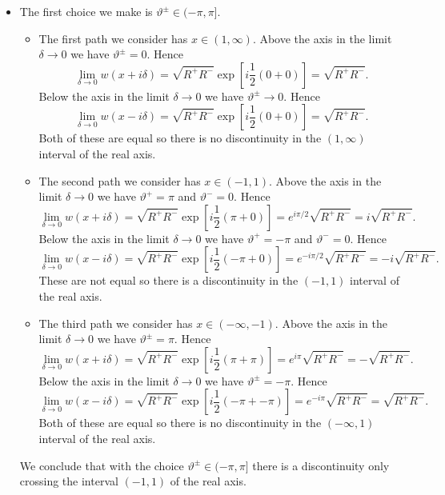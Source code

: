 \documentclass{article}
\begin{document}
    \begin{itemize}
        \item The first choice we make is \(\vartheta^\pm \in (-\pi, \pi]\).
        \begin{itemize}
            \item The first path we consider has \(x \in (1, \infty)\).
            \subitem Above the axis in the limit \(\delta \to 0\) we have \(\vartheta^{\pm} = 0\).
            Hence
            \[\lim_{\delta\to 0} w(x + i\delta) = \sqrt{R^+R^-}\exp\left[i\frac{1}{2}(0 + 0)\right] = \sqrt{R^+R^-}.\]
            \subitem Below the axis in the limit \(\delta \to 0\) we have \(\vartheta^{\pm} \to 0\).
            Hence
            \[\lim_{\delta\to 0} w(x - i\delta) = \sqrt{R^+R^-}\exp\left[i\frac{1}{2}(0 + 0)\right] = \sqrt{R^+R^-}.\]
            Both of these are equal so there is no discontinuity in the \((1, \infty)\) interval of the real axis.
            
            \item The second path we consider has \(x \in (-1, 1)\).
            \subitem Above the axis in the limit \(\delta \to 0\) we have \(\vartheta^+ = \pi\) and \(\vartheta^- = 0\).
            Hence
            \[\lim_{\delta\to 0} w(x + i\delta) = \sqrt{R^+R^-}\exp\left[i\frac{1}{2}(\pi + 0)\right] = e^{i\pi/2}\sqrt{R^+R^-} = i\sqrt{R^+R^-}.\]
            \subitem Below the axis in the limit \(\delta \to 0\) we have \(\vartheta^+ = -\pi\) and \(\vartheta^- = 0\).
            Hence
            \[\lim_{\delta\to 0} w(x - i\delta) = \sqrt{R^+R^-}\exp\left[i\frac{1}{2}(-\pi + 0)\right] = e^{-i\pi/2}\sqrt{R^+R^-} = -i\sqrt{R^+R^-}.\]
            These are not equal so there is a discontinuity in the \((-1, 1)\) interval of the real axis.
            
            \item The third path we consider has \(x\in(-\infty, -1)\).
            \subitem Above the axis in the limit \(\delta \to 0\) we have \(\vartheta^{\pm} = \pi\).
            Hence
            \[\lim_{\delta\to 0} w(x + i\delta) = \sqrt{R^+R^-}\exp\left[i\frac{1}{2}(\pi + \pi)\right] = e^{i\pi}\sqrt{R^+R^-} = -\sqrt{R^+R^-}.\]
            \subitem Below the axis in the limit \(\delta \to 0\) we have \(\vartheta^{\pm} = -\pi\).
            Hence
            \[\lim_{\delta\to 0} w(x - i\delta) = \sqrt{R^+R^-}\exp\left[i\frac{1}{2}(-\pi + -\pi)\right] = e^{-i\pi}\sqrt{R^+R^-} = \sqrt{R^+R^-}.\]
            Both of these are equal so there is no discontinuity in the \((-\infty, 1)\) interval of the real axis.
        \end{itemize}
        We conclude that with the choice \(\vartheta^{\pm} \in (-\pi, \pi]\) there is a discontinuity only crossing the interval \((-1, 1)\) of the real axis.
        

\end{itemize}
\end{document}
